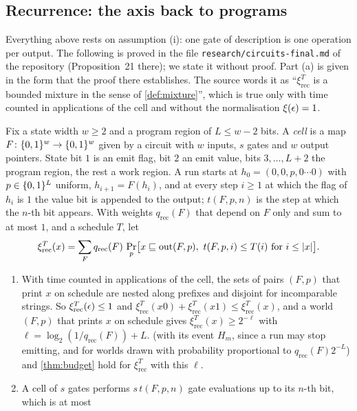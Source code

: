 \subsection{Recurrence: the axis back to programs}

Everything above rests on assumption (i): one gate of description is one operation per output. The following
is proved in the file \texttt{research/circuits-final.md} of the repository (Proposition~21 there); we state
it without proof. Part (a) is given in the form that the proof there establishes. The source words it as
``$\xi^T_{\mathrm{rec}}$ is a bounded mixture in the sense of \cref{def:mixture}'', which is true only with
time counted in applications of the cell and without the normalisation $\xi(\epsilon)=1$.

\begin{proposition}\label{prop:c-recurrence}
Fix a state width $w\ge2$ and a program region of $L\le w-2$ bits. A \emph{cell} is a map $F\colon\{0,1\}^w\to\{0,1\}^w$
given by a circuit with $w$ inputs, $s$ gates and $w$ output pointers. State bit $1$ is an emit flag, bit $2$
an emit value, bits $3,\dots,L+2$ the program region, the rest a work region. A run starts at
$h_0=(0,0,p,0\cdots0)$ with $p\in\{0,1\}^L$ uniform, $h_{i+1}=F(h_i)$, and at every step $i\ge1$ at which the flag
of $h_i$ is $1$ the value bit is appended to the output; $t(F,p,n)$ is the step at which the $n$-th bit
appears. With weights $q_{\mathrm{rec}}(F)$ that depend on $F$ only and sum to at most $1$, and a schedule
$T$, let
\[
\xi^T_{\mathrm{rec}}(x)=\sum_Fq_{\mathrm{rec}}(F)\,
\Pr_p\bigl[x\sqsubseteq\mathrm{out}(F,p),\ t(F,p,i)\le T(i)\text{ for }i\le|x|\bigr].
\]
\begin{enumerate}[label=(\alph*),leftmargin=2em,itemsep=2pt,topsep=2pt]
\item With time counted in applications of the cell, the sets of pairs $(F,p)$ that print $x$ on schedule are
nested along prefixes and disjoint for incomparable strings. So $\xi^T_{\mathrm{rec}}(\epsilon)\le1$ and
$\xi^T_{\mathrm{rec}}(x0)+\xi^T_{\mathrm{rec}}(x1)\le\xi^T_{\mathrm{rec}}(x)$, and a world $(F,p)$ that prints
$x$ on schedule gives $\xi^T_{\mathrm{rec}}(x)\ge2^{-\ell}$ with $\ell=\log_2(1/q_{\mathrm{rec}}(F))+L$.
 (with its event $H_m$, since a run may stop emitting, and for worlds drawn with
probability proportional to $q_{\mathrm{rec}}(F)2^{-L}$) and \cref{thm:budget} hold for $\xi^T_{\mathrm{rec}}$
with this $\ell$.
\item A cell of $s$ gates performs $s\,t(F,p,n)$ gate evaluations up to its $n$-th bit, which is at most

\end{enumerate}
\end{proposition}
